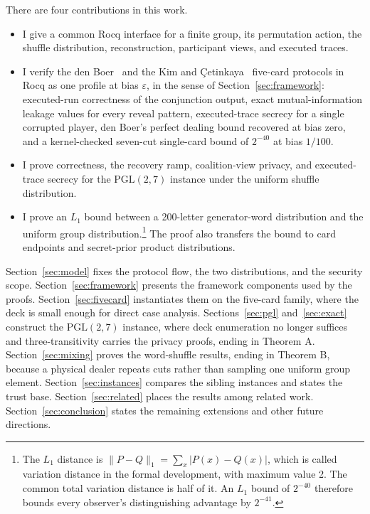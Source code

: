\documentclass[runningheads]{llncs}
\newcommand{\Rocq}{Rocq}
\newcommand{\PG}{\mathrm{PGL}(2,7)}
\begin{document}
There are four contributions in this work.
\begin{itemize}
\item I give a common \Rocq{} interface for a finite group, its permutation
  action, the shuffle distribution, reconstruction, participant views, and executed
  traces.
\item I verify the den Boer~\cite{denBoer1989} and the Kim and
  \c{C}etinkaya~\cite{KimCetinkaya2025} five-card protocols in \Rocq{} as
  one profile at bias $\varepsilon$, in the sense of
  Section~\ref{sec:framework}: executed-run correctness of the
  conjunction output, exact mutual-information leakage values for every
  reveal pattern, executed-trace secrecy for a single corrupted player,
  den Boer's perfect dealing bound recovered at bias zero, and a
  kernel-checked seven-cut single-card bound of $2^{-40}$ at bias $1/100$.
\item I prove correctness, the recovery ramp, coalition-view privacy, and
  executed-trace secrecy for the $\PG$ instance under the uniform shuffle
  distribution.
\item I prove an $L_1$ bound between a 200-letter generator-word distribution
  and the uniform group distribution.\footnote{The $L_1$ distance is
  $\lVert P-Q\rVert_1=\sum_x\lvert P(x)-Q(x)\rvert$, which is called
  variation distance in the formal development, with maximum value 2. The common total
  variation distance is half of it. An $L_1$ bound of $2^{-40}$ therefore
  bounds every observer's distinguishing advantage by $2^{-41}$.} The proof
  also transfers the bound to card
  endpoints and secret-prior product distributions.
\end{itemize}

Section~\ref{sec:model} fixes the protocol flow, the two distributions, and
the security scope. Section~\ref{sec:framework} presents the framework components used by
the proofs. Section~\ref{sec:fivecard} instantiates them on the five-card
family, where the deck is small enough for direct case analysis.
Sections~\ref{sec:pgl} and~\ref{sec:exact} construct the $\PG$ instance,
where deck enumeration no longer suffices and three-transitivity carries
the privacy proofs, ending in Theorem A. Section~\ref{sec:mixing} proves
the word-shuffle results, ending in Theorem B, because a physical dealer
repeats cuts rather than sampling one uniform group element. Section~\ref{sec:instances} compares the sibling instances and
states the trust base. Section~\ref{sec:related} places the results among
related work. Section~\ref{sec:conclusion} states the remaining extensions
and other future directions.
\end{document}
